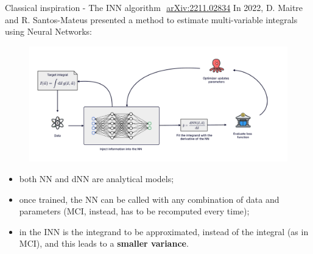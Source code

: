 \documentclass[8pt, xcolor={svgnames}, hyperref={linkcolor=black}]{beamer}
\begin{document}
\begin{frame}{Classical inspiration - The INN algorithm \hfill \faBook\,\,\href{https://arxiv.org/abs/2211.02834}{arXiv:2211.02834}}
In 2022, D. Maitre and R. Santos-Mateus presented a method to estimate multi-variable integrals using 
Neural Networks:
\vspace{-0.28cm}
\pause
\begin{figure}
    \includegraphics[width=1\textwidth]{figures/INN.pdf}
\end{figure}
\pause
\begin{itemize}[noitemsep]
\item[\tiny\faSquare] both NN and dNN are analytical models;
\pause
\item[\tiny\faSquare] once trained, the NN can be called with any
combination of data and parameters (MCI, instead, has to be recomputed every time);
\pause
\item[\tiny\faSquare] in the INN is the integrand to be approximated, instead of 
the integral (as in MCI), and this leads to a \textbf{smaller variance}.
\end{itemize}
\end{frame}
\end{document}

